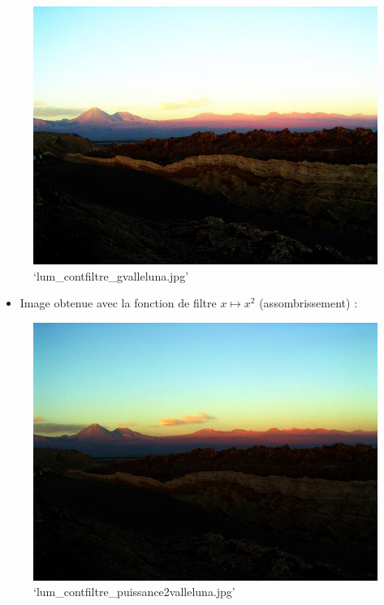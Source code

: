 \documentclass[11pt]{article}
\makeatletter
\def\maxwidth{\ifdim\Gin@nat@width>\linewidth\linewidth
    \else\Gin@nat@width\fi}
\let\Oldincludegraphics\includegraphics
\renewcommand{\includegraphics}[1]{\Oldincludegraphics[width=.8\maxwidth]{#1}}
\providecommand{\tightlist}{%
      \setlength{\itemsep}{0pt}\setlength{\parskip}{0pt}}
\makeatother
\begin{document}
\begin{figure}
\centering
\includegraphics{lum_contfiltre_gvalleluna.jpg}
\caption{`lum\_contfiltre\_gvalleluna.jpg'}
\end{figure}

\begin{itemize}
\tightlist
\item
  Image obtenue avec la fonction de filtre \(x \mapsto x^2\)
  (assombrissement) :
\end{itemize}

\begin{figure}
\centering
\includegraphics{lum_contfiltre_puissance2valleluna.jpg}
\caption{`lum\_contfiltre\_puissance2valleluna.jpg'}
\end{figure}
\end{document}
